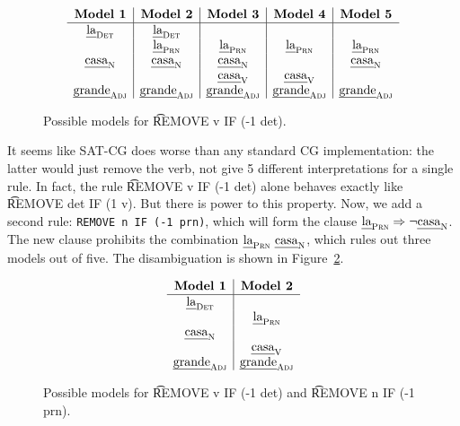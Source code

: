 \begin{figure}[h]
\centering
$$\begin{array}{ c | c | c | c | c}
\textbf{Model 1}  & \textbf{Model 2}  & \textbf{Model 3} & \textbf{Model 4} & \textbf{Model 5} \\ \hline
 \laDet   &  \laDet  &         &        &        \\
          &  \laPrn  & \laPrn  & \laPrn & \laPrn \\
 \casaN   &  \casaN  & \casaN  &        & \casaN \\
          &          & \casaV  & \casaV &         \\
\grandeAdj & \grandeAdj & \grandeAdj & \grandeAdj & \grandeAdj \\

\end{array}$$
\caption{Possible models for \t{REMOVE v IF (-1 det)}.}
\label{fig:modelsOneRule}
\end{figure}


It seems like SAT-CG does worse than any standard CG implementation:
the latter would just remove the verb, not give 5 different interpretations for a single rule.
In fact, the rule \t{REMOVE v IF (-1 det)} alone behaves exactly like \t{REMOVE det IF (1 v)}.
But there is power to this property. Now, we add a second rule: \texttt{REMOVE n IF (-1 prn)}, which will form the clause $\text{\em la}_{\text{\sc Prn}} \Rightarrow \neg \text{\em casa}_{\text{\sc N}}$. The new clause
prohibits the combination $\laPrn \ \casaN$, which rules out three models out of five. The disambiguation is shown in Figure~\ref{fig:modelsTwoRules}.

\begin{figure}[h!]
\centering
$$\begin{array}{ c | c }
 \textbf{Model 1}  & \textbf{Model 2}  \\ \hline
 \laDet   &          \\
          &  \laPrn  \\
 \casaN   &          \\
          &  \casaV   \\
\grandeAdj & \grandeAdj \\

\end{array}$$
\caption{Possible models for \t{REMOVE v IF (-1 det)} and \t{REMOVE n IF (-1 prn)}.}
\label{fig:modelsTwoRules}
\end{figure}


